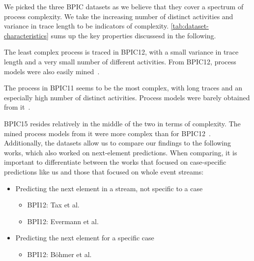 We picked the three BPIC datasets as we believe that they cover a spectrum of process complexity. We take the increasing number of distinct activities and variance in trace length to be indicators of complexity. \autoref{tab:dataset-characteristics} sums up the key properties discussesd in the following.

The least complex process is traced in BPIC12, with a small variance in trace length and a very small number of different activities. From BPIC12, process models were also easily mined~\cite{adriansyah2012mining}.

The process in BPIC11 seems to be the most complex, with long traces and an especially high number of distinct activities. Process models were barely obtained from it~\cite{bose2011analysis}.

BPIC15 resides relatively in the middle of the two in terms of complexity. The mined process models from it were more complex than for BPIC12~\cite{van2015benchmarking}.\\

\noindent Additionally, the datasets allow us to compare our findings to the following works, which also worked on next-element predictions. When comparing, it is important to differentiate between the works that focused on case-specific predictions like us and those that focused on whole event streams:

\begin{itemize}
    \item Predicting the next element in a stream, not specific to a case
    \begin{itemize}
        \item BPI12: Tax et al.~\cite{tax2017}
        \item BPI12: Evermann et al.~\cite{evermann2016}
    \end{itemize}
    \item Predicting the next element for a specific case
    \begin{itemize}
        \item BPI12: Böhmer et al.~\cite{boehmer2018probability}
    \end{itemize}
\end{itemize}

